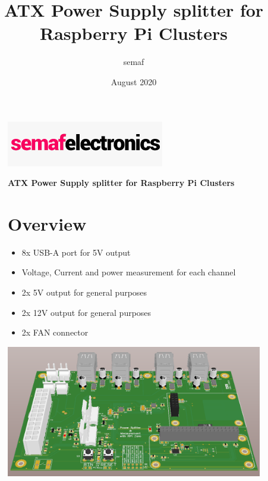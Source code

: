 \documentclass[a4paper,14pt,oneside,pdflatex,english,final,twocolumn]{article}
\title{ATX Power Supply splitter for Raspberry Pi Clusters}
\author{semaf}
\date{August 2020}
\begin{document}
\pagestyle{fancy}

\chead {\today}

\onecolumn

\begin{figure}
	\begin{minipage}{0.47\textwidth}
		\centering
		\includegraphics[width=.7\textwidth,left,]{img/semaf_logo.png}

	\end{minipage}
	\hfill
	\begin{minipage}{0.47\textwidth}
		\raggedleft
		\Huge \textbf{ATX Power Supply splitter for Raspberry Pi Clusters}
	\end{minipage}
\end{figure}


\begin{figure}
	\begin{minipage}{0.47\textwidth}

		\section{Overview}
		\begin{itemize}
			\item 8x USB-A port for 5V output
			\item Voltage, Current and power measurement for each channel
			\item 2x 5V output for general purposes
			\item 2x 12V output for general purposes
			\item 2x FAN connector
		\end{itemize}


	\end{minipage}
	\hfill
	\begin{minipage}{0.47\textwidth}
		\centering
		\includegraphics[width=1.0\textwidth,right]{img/Alt_Front.png}

	\end{minipage}
\end{figure}
\end{document}
